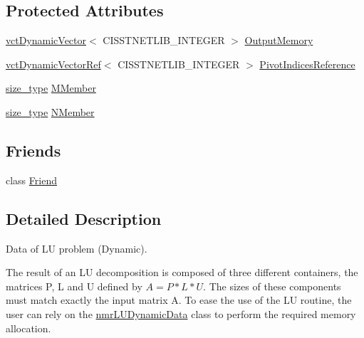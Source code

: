 \subsection*{Protected Attributes}
\begin{DoxyCompactItemize}
\item 
\hyperlink{classvct_dynamic_vector}{vct\+Dynamic\+Vector}$<$ C\+I\+S\+S\+T\+N\+E\+T\+L\+I\+B\+\_\+\+I\+N\+T\+E\+G\+E\+R $>$ \hyperlink{classnmr_l_u_dynamic_data_acf9e9d0bb436f0e04c6d6138b1cbd8fd}{Output\+Memory}
\item 
\hyperlink{classvct_dynamic_vector_ref}{vct\+Dynamic\+Vector\+Ref}$<$ C\+I\+S\+S\+T\+N\+E\+T\+L\+I\+B\+\_\+\+I\+N\+T\+E\+G\+E\+R $>$ \hyperlink{classnmr_l_u_dynamic_data_a45c056cf29f16a5e97fafee6484a009e}{Pivot\+Indices\+Reference}
\end{DoxyCompactItemize}
{\bf }\par
\begin{DoxyCompactItemize}
\item 
\hyperlink{classnmr_l_u_dynamic_data_a63259a289f8f94498b5102ce39722bbe}{size\+\_\+type} \hyperlink{classnmr_l_u_dynamic_data_a859065b13cb287c4e0e67be01f9a779b}{M\+Member}
\item 
\hyperlink{classnmr_l_u_dynamic_data_a63259a289f8f94498b5102ce39722bbe}{size\+\_\+type} \hyperlink{classnmr_l_u_dynamic_data_a44878cc0e7c2c01ea964a57d447b64bb}{N\+Member}
\end{DoxyCompactItemize}

\subsection*{Friends}
\begin{DoxyCompactItemize}
\item 
class \hyperlink{classnmr_l_u_dynamic_data_a7f8321d57e81bc613d5dbef3410ba70e}{Friend}
\end{DoxyCompactItemize}


\subsection{Detailed Description}
Data of L\+U problem (Dynamic). 

The result of an L\+U decomposition is composed of three different containers, the matrices P, L and U defined by $ A = P * L * U$. The sizes of these components must match exactly the input matrix A. To ease the use of the L\+U routine, the user can rely on the \hyperlink{classnmr_l_u_dynamic_data}{nmr\+L\+U\+Dynamic\+Data} class to perform the required memory allocation.

